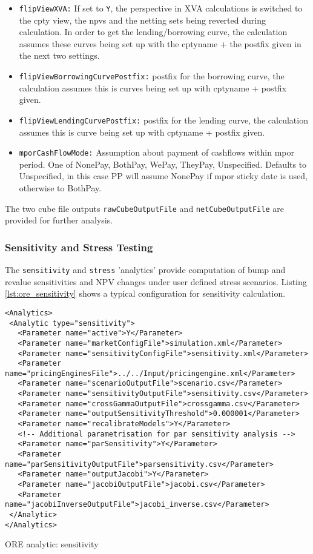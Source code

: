 {\begin{itemize}
\item {\tt flipViewXVA:} If set to {\tt Y}, the perspective in XVA calculations is switched to the cpty view, the npvs and the netting sets being reverted during calculation. In order to get the lending/borrowing curve, the calculation assumes these curves being set up with the cptyname + the postfix given in the next two settings.
\item {\tt flipViewBorrowingCurvePostfix:} postfix for the borrowing curve, the calculation assumes this is curves being set up with cptyname + postfix given.
\item {\tt flipViewLendingCurvePostfix:} postfix for the lending curve, the calculation assumes this is curve being set up with cptyname + postfix given.
\item {\tt mporCashFlowMode:} Assumption about payment of cashflows within mpor period. One of NonePay, BothPay, WePay,
  TheyPay, Unspecified. Defaults to Unspecified, in this case PP will assume NonePay if mpor sticky date is used,
  otherwise to BothPay.
\end{itemize}

The two cube file outputs {\tt rawCubeOutputFile} and {\tt netCubeOutputFile} are provided for further analysis.

\subsubsection{Sensitivity and Stress Testing}

The {\tt sensitivity} and {\tt stress} 'analytics' provide computation of bump and revalue
sensitivities and NPV changes under user defined stress scenarios. Listing \ref{lst:ore_sensitivity}
shows a typical configuration for sensitivity calculation.

\begin{listing}[H]
\begin{verbatim}
<Analytics>
 <Analytic type="sensitivity">
   <Parameter name="active">Y</Parameter>
   <Parameter name="marketConfigFile">simulation.xml</Parameter>
   <Parameter name="sensitivityConfigFile">sensitivity.xml</Parameter>
   <Parameter name="pricingEnginesFile">../../Input/pricingengine.xml</Parameter>
   <Parameter name="scenarioOutputFile">scenario.csv</Parameter>
   <Parameter name="sensitivityOutputFile">sensitivity.csv</Parameter>
   <Parameter name="crossGammaOutputFile">crossgamma.csv</Parameter>
   <Parameter name="outputSensitivityThreshold">0.000001</Parameter>
   <Parameter name="recalibrateModels">Y</Parameter>
   <!-- Additional parametrisation for par sensitivity analysis -->
   <Parameter name="parSensitivity">Y</Parameter>
   <Parameter name="parSensitivityOutputFile">parsensitivity.csv</Parameter>
   <Parameter name="outputJacobi">Y</Parameter>
   <Parameter name="jacobiOutputFile">jacobi.csv</Parameter>
   <Parameter name="jacobiInverseOutputFile">jacobi_inverse.csv</Parameter>
 </Analytic>
</Analytics>
\end{verbatim}
\caption{ORE analytic: sensitivity}
\label{lst:ore_sensitivity}
\end{listing}

}
